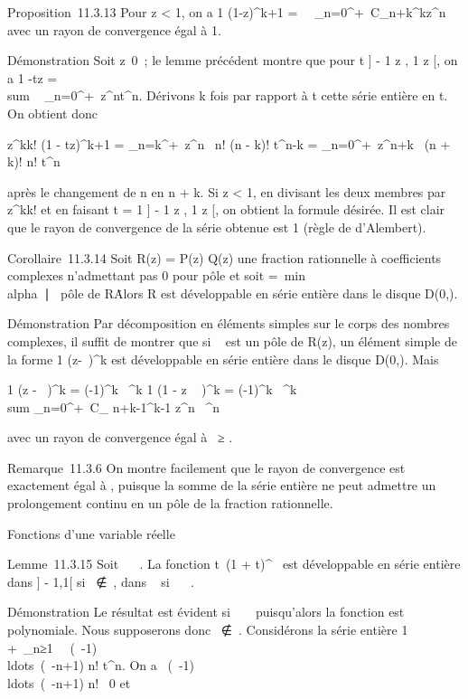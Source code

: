 \documentclass[]{article}
\begin{document}
Proposition~11.3.13 Pour z < 1, on a  1
\over (1-z)^k+1 =\
\sum ~
_n=0^+\infty~C_n+k^kz^n avec un rayon
de convergence égal à 1.

Démonstration Soit z\neq~0~; le lemme précédent
montre que pour t \in] - 1 \over
z , 1 \over
z [, on a  1 -tz
= \\sum ~
_n=0^+\infty~z^nt^n. Dérivons k fois par
rapport à t cette série entière en t. On obtient donc

 z^kk! \over (1 - tz)^k+1 =
\sum _n=k^+\infty~z^n~ n!
\over (n - k)! t^n-k =
\sum _n=0^+\infty~z^n+k~ (n +
k)! \over n! t^n

après le changement de n en n + k. Si z <
1, en divisant les deux membres par z^kk! et en faisant t = 1
\in] - 1 \over z , 1
\over z [, on obtient la formule
désirée. Il est clair que le rayon de convergence de la série obtenue
est 1 (règle de d'Alembert).

Corollaire~11.3.14 Soit R(z) = P(z) \over Q(z) une
fraction rationnelle à coefficients complexes n'admettant pas 0 pour
pôle et soit \rho =\
min\\alpha~∣\alpha~\text
pôle de R\. Alors R est développable en série entière
dans le disque D(0,\rho).

Démonstration Par décomposition en éléments simples sur le corps des
nombres complexes, il suffit de montrer que si \alpha~ est un pôle de R(z), un
élément simple de la forme  1 \over
(z-\alpha~)^k est développable en série entière dans le disque
D(0,\rho). Mais

 1 \over (z - \alpha~)^k = (-1)^k
\over \alpha~^k  1 \over (1 -
z \over \alpha~ )^k = (-1)^k
\over \alpha~^k  \\sum
_n=0^+\infty~C_ n+k-1^k-1 z^n
\over \alpha~^n

avec un rayon de convergence égal à \alpha~≥ \rho.

Remarque~11.3.6 On montre facilement que le rayon de convergence est
exactement égal à \rho, puisque la somme de la série entière ne peut
admettre un prolongement continu en un pôle de la fraction rationnelle.

Fonctions d'une variable réelle

Lemme~11.3.15 Soit \alpha~ \in {}~. La fonction t\mapsto~(1
+ t)^\alpha~ est développable en série entière dans ] - 1,1[ si
\alpha~∉\mathbb{N}~, dans \mathbb{R}~ si \alpha~ \in {}~.

Démonstration Le résultat est évident si \alpha~ \in {}~ puisqu'alors la fonction
est polynomiale. Nous supposerons donc \alpha~∉\mathbb{N}~.
Considérons la série entière 1 +\
\sum  _n≥1~
\alpha~(\alpha~-1)\\ldots~(\alpha~-n+1)
\over n! t^n. On a 
\alpha~(\alpha~-1)\\ldots~(\alpha~-n+1)
\over n! \neq~0 et
\end{document}
